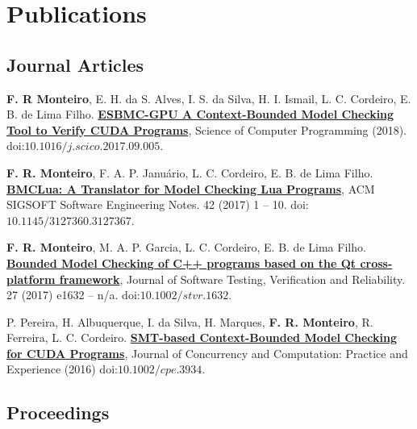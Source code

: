 \documentclass[letterpaper]{article}
\renewenvironment{itemize}{
  \begin{list}{}{
    \setlength{\leftmargin}{1.5em}
  }
}{
  \end{list}
}
\begin{document}
\section*{Publications}

\subsection*{Journal Articles}

\begin{itemize}
\item {\bf F. R Monteiro}, E. H. da S. Alves, I. S. da Silva, H. I. Ismail, L. C. Cordeiro, E. B. de Lima Filho. \href{http://www.sciencedirect.com/science/article/pii/S0167642317301934}{{\bf ESBMC-GPU A Context-Bounded Model Checking Tool to Verify CUDA Programs}}, Science of Computer Programming (2018). doi:$10.1016/j.scico.2017.09.005$.

\item {\bf F. R. Monteiro}, F. A. P. Janu\'{a}rio, L. C. Cordeiro, E. B. de Lima Filho. \href{https://dl.acm.org/citation.cfm?id=3127367}{{\bf BMCLua: A Translator for Model Checking Lua Programs}}, ACM SIGSOFT Software Engineering Notes. 42 (2017) 1 -- 10. doi:$10.1145/3127360.3127367$.

\item {\bf F. R. Monteiro}, M. A. P. Garcia, L. C. Cordeiro, E. B. de Lima Filho. \href{http://onlinelibrary.wiley.com/doi/10.1002/stvr.1632/full}{{\bf Bounded Model Checking of C++ programs based on the Qt cross-platform framework}}, Journal of Software Testing, Verification and Reliability. 27 (2017) e1632 -- n/a. doi:$10.1002/stvr.1632$.

\item P. Pereira, H. Albuquerque, I. da Silva, H. Marques, {\bf F. R. Monteiro}, R. Ferreira, L. C. Cordeiro. \href{http://onlinelibrary.wiley.com/doi/10.1002/cpe.3934/full}{{\bf SMT-based Context-Bounded Model Checking for CUDA Programs}}, Journal of Concurrency and Computation: Practice and Experience (2016) doi:$10.1002/cpe.3934$.

\end{itemize}

\subsection*{Proceedings}
\end{document}
